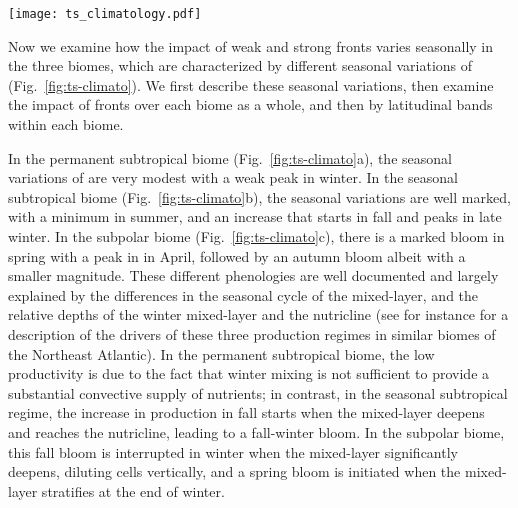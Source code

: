 \begin{figure*}
  \texttt{[image: ts\_climatology.pdf]}
  \caption{
    Seasonal impact of fronts on  in the permanent subtropical biome (1st column), in the seasonal subtropical biome (2nd column) and in the subpolar biome (3rd column).
    (a-b-c)  median values (top row) over weak fronts (blue), strong fronts (green) and background (red).
    The differences between the curves show the local impact at the scale of fronts.
    (d-e-f) Surface fraction occupied by weak fronts and strong fronts.
    (g-h-i) Global  surplus due to weak fronts and strong fronts at the scale of the biome.
    The surplus accounts for the local excess and for the number of fronts (see method).
    The plain lines represent the climatological mean, and the envelopes mark the standard deviation over the period 2000--2020.
     is more strongly enhanced over strong fronts than over weak fronts, but weak fronts are more numerous than strong fronts, resulting in a  surplus that can be reversed.
  }%
  \label{fig:ts-climato}
\end{figure*}

Now we examine how the impact of weak and strong fronts varies seasonally in the three biomes, which are characterized by different seasonal variations of  (Fig.~\ref{fig:ts-climato}).
We first describe these seasonal variations, then examine the impact of fronts over each biome as a whole, and then by latitudinal bands within each biome.

In the permanent subtropical biome (Fig.~\ref{fig:ts-climato}a), the seasonal variations of  are very modest with a weak peak in winter.
In the seasonal subtropical biome (Fig.~\ref{fig:ts-climato}b), the seasonal variations are well marked, with a minimum in summer, and an increase that starts in fall and peaks in late winter.
In the subpolar biome (Fig.~\ref{fig:ts-climato}c), there is a marked bloom in spring with a peak in  in April, followed by an autumn bloom albeit with a smaller magnitude.
These different phenologies are well documented and largely explained by the differences in the seasonal cycle of the mixed-layer, and the relative depths of the winter mixed-layer and the nutricline (see for instance \citet{levy_2005a} for a description of the drivers of these three production regimes in similar biomes of the Northeast Atlantic).
In the permanent subtropical biome, the low productivity is due to the fact that winter mixing is not sufficient to provide a substantial convective supply of nutrients; in contrast, in the seasonal subtropical regime, the increase in production in fall starts when the mixed-layer deepens and reaches the nutricline, leading to a fall-winter bloom.
In the subpolar biome, this fall bloom is interrupted in winter when the mixed-layer significantly deepens, diluting cells vertically, and a spring bloom is initiated when the mixed-layer stratifies at the end of winter.

